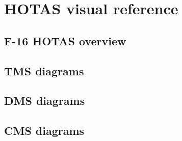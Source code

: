 \documentclass[11pt, a4paper, twoside]{report}
\begin{document}
\newpage
\chapter{HOTAS visual reference}

\section{F-16 HOTAS overview}

\section{TMS diagrams}

\section{DMS diagrams}

\section{CMS diagrams}

\appendix
\end{document}
